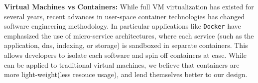 \noindent
\textbf{Virtual Machines vs Containers:} 
While full VM virtualization has existed for several years, recent advances in user-space container technologies has changed software engineering methodology. 
In particular applications like \texttt{Docker} have emphasized the use of micro-service architectures, where each service (such as the application, dns, indexing, or storage) is sandboxed in separate containers. 
This allows developers to isolate each software and spin off containers at ease.
While \parikshan can be applied to traditional virtual machines, we believe that containers are more light-weight(less resouce usage), and lend themselves better to our design.


